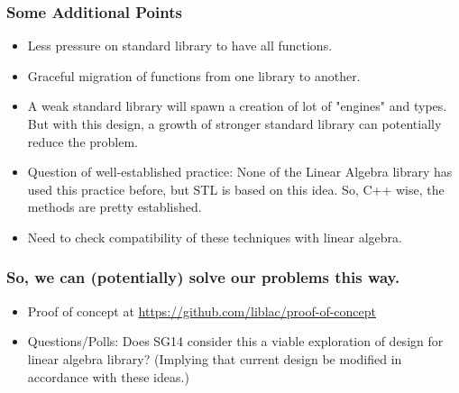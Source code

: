 \documentclass[dvipsnames,10pt]{jbeamer}
\begin{document}
\begin{frame}
  \frametitle{Some Additional Points}

  \begin{itemize}
    \item Less pressure on standard library to have all functions.
    \item Graceful migration of functions from one library to another.
    \item A weak standard library will spawn a creation of lot of "engines" and
      types. But with this design, a growth of  stronger standard library can
      potentially reduce the problem.
    \item Question of well-established practice: None of the Linear Algebra
      library has used this practice before, but STL is based on this idea.
      So, C++ wise, the methods are pretty established.
    \item Need to check compatibility of these techniques with linear algebra.
  \end{itemize}
\end{frame}



\begin{frame}
  \frametitle{So, we can (potentially) solve our problems this way.}

  \begin{itemize}
    \item Proof of concept at
      \url{https://github.com/liblac/proof-of-concept}

    \item Questions/Polls: Does SG14 consider this a viable exploration of
      design for linear algebra library?
      (Implying that current design be modified in accordance with these ideas.)
  \end{itemize}
\end{frame}
\end{document}
